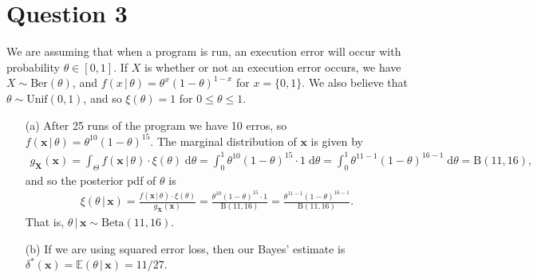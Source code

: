 \documentclass[10pt]{article}
\begin{document}
\section{Question 3} \noindent
We are assuming that when a program is run, an execution error will occur with probability \(\theta \in [0,1]\). If \(X\) is whether or not an execution error
occurs, we have \(X \sim \mathrm{Ber}(\theta)\), and \(f(x \,|\, \theta) = \theta^x (1 - \theta)^{1 - x}\) for \(x = \{0,1\}\). We also believe that 
\(\theta \sim \mathrm{Unif}(0,1)\), and so \(\xi(\theta) = 1\) for \(0 \le \theta \le 1\).
\begin{itemize}
    \item[(a)] After 25 runs of the program we have 10 erros, so \(f(\mathbf{x} \,|\, \theta) = \theta^{10}(1 - \theta)^{15}\). The marginal distribution of 
    \(\mathbf{x}\) is given by 
    \begin{align*}
        g_{\bm{X}}(\mathbf{x})
        = \int_{\Theta} f(\mathbf{x} \,|\, \theta) \cdot \xi(\theta) \;\mathrm{d}\theta 
        = \int_0^1 \theta^{10} (1 - \theta)^{15} \cdot 1 \;\mathrm{d}\theta
        = \int_0^1 \theta^{11 - 1} (1 - \theta)^{16 - 1} \;\mathrm{d}\theta
        = \mathrm{B}(11, 16),
    \end{align*}
    and so the posterior pdf of \(\theta\) is 
    \begin{align*}
        \xi(\theta \,|\, \mathbf{x})
        = \frac{f(\mathbf{x} \,|\, \theta) \cdot \xi(\theta)}{g_{\bm{X}}(\mathbf{x})}
        = \frac{\theta^{10} (1 - \theta)^{15} \cdot 1}{\mathrm{B}(11, 16)}
        = \frac{\theta^{11 - 1} (1 - \theta)^{16 - 1}}{\mathrm{B}(11, 16)}.
    \end{align*}
    That is, \(\theta \,|\, \mathbf{x} \sim \mathrm{Beta}(11, 16)\). 
    \item[(b)] If we are using squared error loss, then our Bayes' estimate is 
    \(\delta^*(\mathbf{x}) = \mathbb{E}(\theta \,|\, \mathbf{x}) = 11/27\).
\end{itemize}

\end{document}

